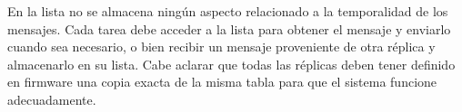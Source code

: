 

En la lista no se almacena ningún aspecto relacionado a la temporalidad de los mensajes. Cada tarea debe acceder a la lista para obtener el mensaje y enviarlo cuando sea necesario, o bien recibir un mensaje proveniente de otra réplica y almacenarlo en su lista. Cabe aclarar que todas las réplicas deben tener definido en firmware una copia exacta de la misma tabla para que el sistema funcione adecuadamente. %



